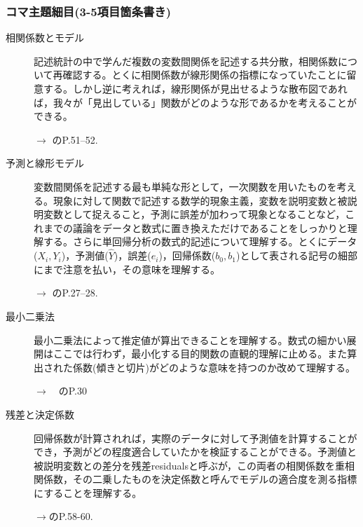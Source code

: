 \subsubsection{コマ主題細目(3-5項目箇条書き)}
\begin{description}
	\item[相関係数とモデル]記述統計の中で学んだ複数の変数間関係を記述する共分散，相関係数について再確認する。とくに相関係数が線形関係の指標になっていたことに留意する。しかし逆に考えれば，線形関係が見出せるような散布図であれば，我々が「見出している」関数がどのような形であるかを考えることができる。
	      \begin{flushright}
		      $\to$ \citet{kosugi2018}のP.51--52.
	      \end{flushright}

	\item[予測と線形モデル]変数間関係を記述する最も単純な形として，一次関数を用いたものを考える。現象に対して関数で記述する数学的現象主義，変数を説明変数と被説明変数として捉えること，予測に誤差が加わって現象となることなど，これまでの議論をデータと数式に置き換えただけであることをしっかりと理解する。さらに単回帰分析の数式的記述について理解する。とくにデータ($X_i,Y_i$)，予測値($\hat{Y}$)，誤差($e_i$)，回帰係数($b_0,b_1$)として表される記号の細部にまで注意を払い，その意味を理解する。
	      \begin{flushright}
		      $\to$ \citet{Toyoda201706}のP.27--28.
	      \end{flushright}

	\item[最小二乗法]最小二乗法によって推定値が算出できることを理解する。数式の細かい展開はここでは行わず，最小化する目的関数の直観的理解に止める。また算出された係数(傾きと切片)がどのような意味を持つのか改めて理解する。
	      \begin{flushright}
		      $\to$　\citet{Toyoda201706}のP.30
	      \end{flushright}

	\item[残差と決定係数]回帰係数が計算されれば，実際のデータに対して予測値を計算することができ，予測がどの程度適合していたかを検証することができる。予測値と被説明変数との差分を残差residualsと呼ぶが，この両者の相関係数を重相関係数，その二乗したものを決定係数と呼んでモデルの適合度を測る指標にすることを理解する。
	      \begin{flushright}
		      $\to$\citet{Nojima201903}のP.58-60.
	      \end{flushright}

\end{description}
